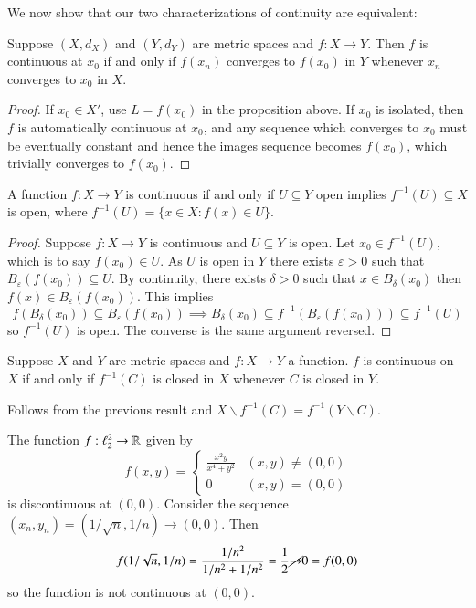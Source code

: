 We now show that our two characterizations of continuity are equivalent:


\begin{proposition}
    Suppose $(X,d_X)$ and $(Y,d_Y)$ are metric spaces and $f:X\rightarrow Y$. Then $f$ is continuous at $x_0$ if and only if $f(x_n)$ converges to $f(x_0)$ in $Y$ whenever $x_n$ converges to $x_0$ in $X$.
\end{proposition}
\begin{proof}
    If $x_0 \in X'$, use $L = f(x_0)$ in the proposition above. If $x_0$ is isolated, then $f$ is automatically continuous at $x_0$, and any sequence which converges to $x_0$ must be eventually constant and hence the images sequence becomes $f(x_0)$, which trivially converges to $f(x_0)$.
\end{proof}


\begin{proposition}\label{prop:3.1.1}
    A function $f:X\rightarrow Y$ is continuous if and only if $U \subseteq Y$ open implies $f^{-1}(U) \subseteq X$ is open, where $f^{-1}(U) = \{x \in X:f(x) \in U\}$.
\end{proposition}
\begin{proof}
    Suppose $f:X\rightarrow Y$ is continuous and $U \subseteq Y$ is open. Let $x_0 \in f^{-1}(U)$, which is to say $f(x_0) \in U$. As $U$ is open in $Y$ there exists $\varepsilon > 0$ such that $B_{\varepsilon}(f(x_0)) \subseteq U$. By continuity, there exists $\delta > 0$ such that $x \in B_{\delta}(x_0)$ then $f(x) \in B_{\varepsilon}(f(x_0))$. This implies $$f(B_{\delta}(x_0)) \subseteq B_{\varepsilon}(f(x_0)) \implies B_{\delta}(x_0) \subseteq f^{-1}(B_{\varepsilon}(f(x_0))) \subseteq f^{-1}(U)$$ so $f^{-1}(U)$ is open. The converse is the same argument reversed.
\end{proof}

\begin{corollary}
    Suppose $X$ and $Y$ are metric spaces and $f:X\rightarrow Y$ a function. $f$ is continuous on $X$ if and only if $f^{-1}(C)$ is closed in $X$ whenever $C$ is closed in $Y$.
\end{corollary}

Follows from the previous result and $X\backslash f^{-1}(C) = f^{-1}(Y\backslash C)$.

\begin{example}
    The function $f:\ell_2^2\rightarrow \mathbb R$ given by $$f(x,y) = \left\{\begin{array}{cc} \frac{x^2y}{x^4+y^2} & (x,y)\neq (0,0) \\ 0 & (x,y) = (0,0) \end{array}\right.$$ is discontinuous at $(0,0)$. Consider the sequence $(x_n,y_n) = (1/\sqrt{n},1/n)\rightarrow (0,0)$. Then $$f(1/\sqrt{n},1/n) = \frac{1/n^2}{1/n^2+1/n^2} = \frac{1}{2}\cancel{\rightarrow} 0 = f(0,0)$$ so the function is not continuous at $(0,0)$.
\end{example}

